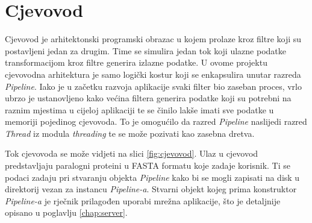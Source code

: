 \chapter{Cjevovod}
\label{chap:cjevovod}

Cjevovod je arhitektonski programski obrazac u kojem prolaze kroz filtre koji su
postavljeni jedan za drugim. Time se simulira jedan tok koji ulazne podatke
transformacijom kroz filtre generira izlazne podatke. U ovome projektu
cjevovodna arhitektura je samo logički kostur koji se enkapsulira unutar razreda
\emph{Pipeline}. Iako je u začetku razvoja aplikacije svaki filter bio zaseban
proces, vrlo ubrzo je ustanovljeno kako većina filtera generira podatke koji su
potrebni na raznim mjestima u cijeloj aplikaciji te se činilo lakše imati sve
podatke u memoriji pojedinog cjevovoda. To je omogućilo da razred
\emph{Pipeline} naslijedi razred \emph{Thread} iz modula \emph{threading} te se
može pozivati kao zasebna dretva.

Tok cjevovoda se može vidjeti na slici \ref{fig:cjevovod}. Ulaz u cjevovod
predstavljaju paralogni proteini u FASTA formatu koje zadaje korisnik. Ti se
podaci zadaju pri stvaranju objekta \emph{Pipeline} kako bi se mogli zapisati na
disk u direktorij vezan za instancu \emph{Pipeline-a}. Stvarni objekt kojeg
prima konstruktor \emph{Pipeline-a} je rječnik prilagođen uporabi mrežna
aplikacije, što je detaljnije opisano u poglavlju \ref{chap:server}.

